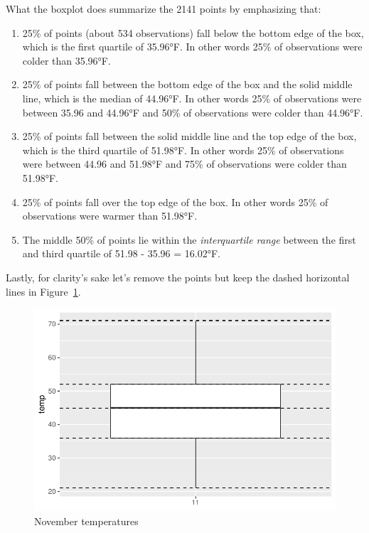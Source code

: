 \documentclass[
  letterpaper,
  DIV=11,
  numbers=noendperiod]{scrreprt}
\theoremstyle{definition}
\theoremstyle{remark}
\begin{document}
What the boxplot does summarize the 2141 points by emphasizing that:

\begin{enumerate}
\def\labelenumi{\arabic{enumi}.}
\item
  25\% of points (about 534 observations) fall below the bottom edge of
  the box, which is the first quartile of 35.96°F. In other words 25\%
  of observations were colder than 35.96°F.
\item
  25\% of points fall between the bottom edge of the box and the solid
  middle line, which is the median of 44.96°F. In other words 25\% of
  observations were between 35.96 and 44.96°F and 50\% of observations
  were colder than 44.96°F.
\item
  25\% of points fall between the solid middle line and the top edge of
  the box, which is the third quartile of 51.98°F. In other words 25\%
  of observations were between 44.96 and 51.98°F and 75\% of
  observations were colder than 51.98°F.
\item
  25\% of points fall over the top edge of the box. In other words 25\%
  of observations were warmer than 51.98°F.
\item
  The middle 50\% of points lie within the \emph{interquartile range}
  between the first and third quartile of 51.98 - 35.96 = 16.02°F.
\end{enumerate}

Lastly, for clarity's sake let's remove the points but keep the dashed
horizontal lines in Figure~\ref{fig-nov4}.

\begin{figure}

{\centering \includegraphics{02-visualization_files/figure-pdf/fig-nov4-1.pdf}

}

\caption{\label{fig-nov4}November temperatures}

\end{figure}
\end{document}

